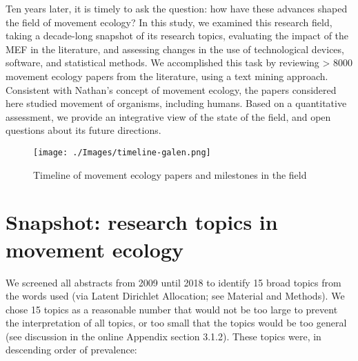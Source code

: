 \documentclass[a4paper,12pt]{article}
\begin{document}
Ten years later, it is timely to ask the question: how have these
advances shaped the field of movement ecology? In this study, we
examined this research field, taking a decade-long snapshot of its
research topics, evaluating the impact of the MEF in the literature, and
assessing changes in the use of technological devices, software, and
statistical methods. We accomplished this task by reviewing
\textgreater{} 8000 movement ecology papers from the literature, using a
text mining approach. Consistent with Nathan's concept of movement
ecology, the papers considered here studied movement of organisms,
including humans. Based on a quantitative assessment, we provide an
integrative view of the state of the field, and open questions about its
future directions.

\begin{figure}
	\texttt{[image: ./Images/timeline-galen.png]}
	\caption{Timeline of movement ecology papers and milestones in the field}
	\label{fig:timeline}
\end{figure}

\section*{Snapshot: research topics in movement ecology}

We screened all abstracts from 2009 until 2018 to identify 15 broad
topics from the words used (via Latent Dirichlet Allocation; see
Material and Methods). We chose 15 topics as a reasonable number that
would not be too large to prevent the interpretation of all topics, or
too small that the topics would be too general (see discussion in
the online Appendix section 3.1.2). These topics were, in descending order of
prevalence:
\end{document}
